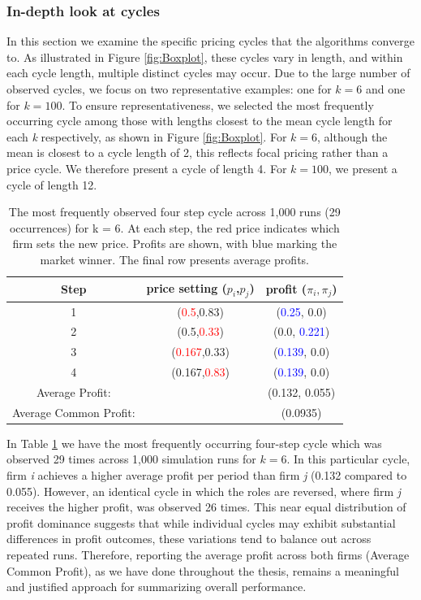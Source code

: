 \documentclass{article}
\begin{document}
\subsubsection{In-depth look at cycles}
\label{In-depth look at cycles}
In this section we examine the specific pricing cycles that the algorithms converge to. As illustrated in Figure \ref{fig:Boxplot}, these cycles vary in length, and within each cycle length, multiple distinct cycles may occur. Due to the large number of observed cycles, we focus on two representative examples: one for $k = 6$ and one for $k=100$. To ensure representativeness, we selected the most frequently occurring cycle among those with lengths closest to the mean cycle length for each \textit{k} respectively, as shown in Figure \ref{fig:Boxplot}. For $k = 6$, although the mean is closest to a cycle length of 2, this reflects focal pricing rather than a price cycle. We therefore present a cycle of length 4. For $k = 100$, we present a cycle of length 12.
\begin{table}[H]
    \centering
    \begin{tabular}{|c|c|c|}
        \hline
        Step & price setting ($p_i$,$p_j$) &  profit ($\pi_i,\pi_j$) \\
        \hline
        1 & (\textcolor{red}{0.5},0.83) & (\textcolor{blue}{0.25}, 0.0)  \\
        \hline
        2 & (0.5,\textcolor{red}{0.33}) & (0.0, \textcolor{blue}{0.221}) \\
        \hline
        3 & (\textcolor{red}{0.167},0.33) & (\textcolor{blue}{0.139}, 0.0)  \\
        \hline
        4 & (0.167,\textcolor{red}{0.83}) & (\textcolor{blue}{0.139}, 0.0)  \\
        \hline
        Average Profit: & & (0.132, 0.055) \\
         \hline
        Average Common Profit: & & (0.0935) \\
         \hline
    \end{tabular}
    \caption{The most frequently observed four step cycle across 1,000 runs (29 occurrences) for k = 6. At each step, the red price indicates which firm sets the new price. Profits are shown, with blue marking the market winner. The final row presents average profits.}
    \label{tab:PriceCycleLen4}
\end{table}
In Table \ref{tab:PriceCycleLen4} we have the most frequently occurring four-step cycle which was observed 29 times across 1,000 simulation runs for $k = 6$. In this particular cycle, firm \textit{i} achieves a higher average profit per period than firm \textit{j} (0.132 compared to 0.055). However, an identical cycle in which the roles are reversed, where firm \textit{j} receives the higher profit, was observed 26 times. This near equal distribution of profit dominance suggests that while individual cycles may exhibit substantial differences in profit outcomes, these variations tend to balance out across repeated runs. Therefore, reporting the average profit across both firms (Average Common Profit), as we have done throughout the thesis, remains a meaningful and justified approach for summarizing overall performance.
\end{document}
